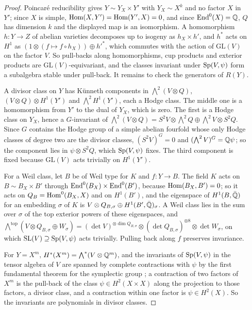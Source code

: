 \begin{proof}
Poincar\'e reducibility gives $Y\sim Y_{X}\times Y'$ with $Y_{X}\sim X^{k}$ and no factor $X$ in $Y'$; since $X$ is simple, $\mathrm{Hom}(X,Y')=\mathrm{Hom}(Y',X)=0$, and since $\mathrm{End}^{0}(X)=\mathbb{Q}$, $Q$ has dimension $k$ and the displayed map is an isomorphism. A homomorphism $h\colon Y\to Z$ of abelian varieties decomposes up to isogeny as $h_{X}\times h'$, and $h^{*}$ acts on $H^{1}$ as $(1\otimes(f\mapsto f\circ h_{X}))\oplus h'^{*}$, which commutes with the action of $\mathrm{GL}(V)$ on the factor $V$. So pull-backs along homomorphisms, cup products and exterior products are $\mathrm{GL}(V)$-equivariant, and the classes invariant under $\mathrm{Sp}(V,\psi)$ form a subalgebra stable under pull-back. It remains to check the generators of $R(Y)$.

A divisor class on $Y$ has K\"unneth components in $\bigwedge^{2}(V\otimes Q)$, $(V\otimes Q)\otimes H^{1}(Y')$ and $\bigwedge^{2}H^{1}(Y')$, each a Hodge class. The middle one is a homomorphism from $Y'$ to the dual of $Y_{X}$, which is zero. The first is a Hodge class on $Y_{X}$, hence a $G$-invariant of $\bigwedge^{2}(V\otimes Q)=S^{2}V\otimes\bigwedge^{2}Q\oplus\bigwedge^{2}V\otimes S^{2}Q$. Since $G$ contains the Hodge group of a simple abelian fourfold whose only Hodge classes of degree two are the divisor classes, $(S^{2}V)^{G}=0$ and $(\bigwedge^{2}V)^{G}=\mathbb{Q}\psi$; so the component lies in $\psi\otimes S^{2}Q$, which $\mathrm{Sp}(V,\psi)$ fixes. The third component is fixed because $\mathrm{GL}(V)$ acts trivially on $H^{1}(Y')$.

For a Weil class, let $B$ be of Weil type for $K$ and $f\colon Y\to B$. The field $K$ acts on $B\sim B_{X}\times B'$ through $\mathrm{End}^{0}(B_{X})\times\mathrm{End}^{0}(B')$, because $\mathrm{Hom}(B_{X},B')=0$; so it acts on $Q_{B}=\mathrm{Hom}^{0}(B_{X},X)$ and on $H^{1}(B')$, and the eigenspace of $H^{1}(B,\bar{\mathbb{Q}})$ for an embedding $\sigma$ of $K$ is $V\otimes Q_{B,\sigma}\oplus H^{1}(B',\bar{\mathbb{Q}})_{\sigma}$. A Weil class lies in the sum over $\sigma$ of the top exterior powers of these eigenspaces, and $\bigwedge^{\mathrm{top}}(V\otimes Q_{B,\sigma}\oplus W_{\sigma})=(\det V)^{\otimes\dim Q_{B,\sigma}}\otimes(\det Q_{B,\sigma})^{\otimes 8}\otimes\det W_{\sigma}$, on which $\mathrm{SL}(V)\supseteq\mathrm{Sp}(V,\psi)$ acts trivially. Pulling back along $f$ preserves invariance.

For $Y=X^{m}$, $H^{*}(X^{m})=\bigwedge^{*}(V\otimes\mathbb{Q}^{m})$, and the invariants of $\mathrm{Sp}(V,\psi)$ in the tensor algebra of $V$ are spanned by complete contractions with $\psi$ by the first fundamental theorem for the symplectic group \cite[Chap.~5]{GW09}; a contraction of two factors of $X^{m}$ is the pull-back of the class $\psi\in H^{2}(X\times X)$ along the projection to those factors, a divisor class, and a contraction within one factor is $\psi\in H^{2}(X)$. So the invariants are polynomials in divisor classes.
\end{proof}

